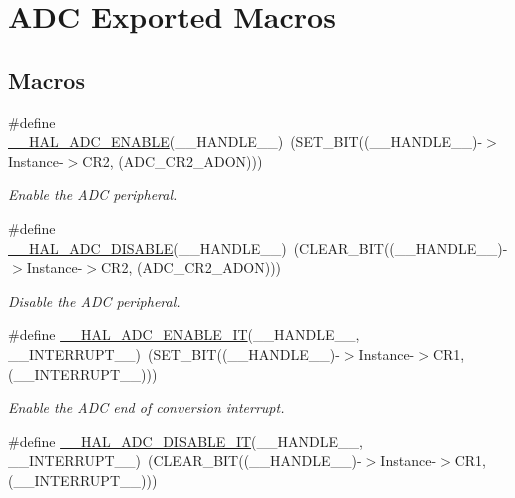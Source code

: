 \hypertarget{group___a_d_c___exported___macros}{}\section{A\+DC Exported Macros}
\label{group___a_d_c___exported___macros}
\subsection*{Macros}
\begin{DoxyCompactItemize}
\item 
\#define \hyperlink{group___a_d_c___exported___macros_gaadf16862da7593def189559423c287f4}{\+\_\+\+\_\+\+H\+A\+L\+\_\+\+A\+D\+C\+\_\+\+E\+N\+A\+B\+LE}(\+\_\+\+\_\+\+H\+A\+N\+D\+L\+E\+\_\+\+\_\+)~(S\+E\+T\+\_\+\+B\+IT((\+\_\+\+\_\+\+H\+A\+N\+D\+L\+E\+\_\+\+\_\+)-\/$>$Instance-\/$>$C\+R2, (A\+D\+C\+\_\+\+C\+R2\+\_\+\+A\+D\+ON)))
\begin{DoxyCompactList}\small\item\em Enable the A\+DC peripheral. \end{DoxyCompactList}\item 
\#define \hyperlink{group___a_d_c___exported___macros_ga8afd5963c41c0a30c5cf1fec5c5710b3}{\+\_\+\+\_\+\+H\+A\+L\+\_\+\+A\+D\+C\+\_\+\+D\+I\+S\+A\+B\+LE}(\+\_\+\+\_\+\+H\+A\+N\+D\+L\+E\+\_\+\+\_\+)~(C\+L\+E\+A\+R\+\_\+\+B\+IT((\+\_\+\+\_\+\+H\+A\+N\+D\+L\+E\+\_\+\+\_\+)-\/$>$Instance-\/$>$C\+R2, (A\+D\+C\+\_\+\+C\+R2\+\_\+\+A\+D\+ON)))
\begin{DoxyCompactList}\small\item\em Disable the A\+DC peripheral. \end{DoxyCompactList}\item 
\#define \hyperlink{group___a_d_c___exported___macros_ga650073de508d335d0a1c7bf9b4d07afe}{\+\_\+\+\_\+\+H\+A\+L\+\_\+\+A\+D\+C\+\_\+\+E\+N\+A\+B\+L\+E\+\_\+\+IT}(\+\_\+\+\_\+\+H\+A\+N\+D\+L\+E\+\_\+\+\_\+,  \+\_\+\+\_\+\+I\+N\+T\+E\+R\+R\+U\+P\+T\+\_\+\+\_\+)~(S\+E\+T\+\_\+\+B\+IT((\+\_\+\+\_\+\+H\+A\+N\+D\+L\+E\+\_\+\+\_\+)-\/$>$Instance-\/$>$C\+R1, (\+\_\+\+\_\+\+I\+N\+T\+E\+R\+R\+U\+P\+T\+\_\+\+\_\+)))
\begin{DoxyCompactList}\small\item\em Enable the A\+DC end of conversion interrupt. \end{DoxyCompactList}\item 
\#define \hyperlink{group___a_d_c___exported___macros_gadcec48b44a2133effd20f41ab227edb9}{\+\_\+\+\_\+\+H\+A\+L\+\_\+\+A\+D\+C\+\_\+\+D\+I\+S\+A\+B\+L\+E\+\_\+\+IT}(\+\_\+\+\_\+\+H\+A\+N\+D\+L\+E\+\_\+\+\_\+,  \+\_\+\+\_\+\+I\+N\+T\+E\+R\+R\+U\+P\+T\+\_\+\+\_\+)~(C\+L\+E\+A\+R\+\_\+\+B\+IT((\+\_\+\+\_\+\+H\+A\+N\+D\+L\+E\+\_\+\+\_\+)-\/$>$Instance-\/$>$C\+R1, (\+\_\+\+\_\+\+I\+N\+T\+E\+R\+R\+U\+P\+T\+\_\+\+\_\+)))

\end{DoxyCompactItemize}
